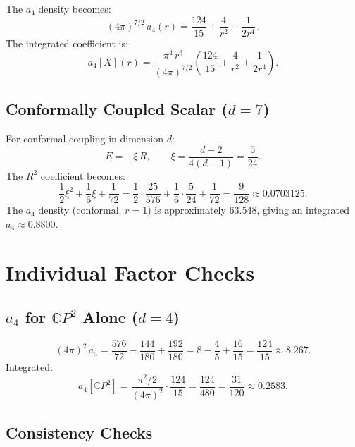 \documentclass[11pt,a4paper]{article}
\begin{document}
The $a_4$ density becomes:
\begin{equation}\label{eq:a4-r}
(4\pi)^{7/2}\,a_4(r) = \frac{124}{15}
  + \frac{4}{r^2} + \frac{1}{2r^4}\,.
\end{equation}
The integrated coefficient is:
\begin{equation}
a_4[X](r) = \frac{\pi^4\,r^3}{(4\pi)^{7/2}}
  \left(\frac{124}{15} + \frac{4}{r^2} + \frac{1}{2r^4}\right).
\end{equation}

\subsection{Conformally Coupled Scalar ($d = 7$)}

For conformal coupling in dimension $d$:
\[
E = -\xi\,R, \qquad \xi = \frac{d-2}{4(d-1)} = \frac{5}{24}.
\]
The $R^2$ coefficient becomes:
\[
\frac{1}{2}\xi^2 + \frac{1}{6}\xi + \frac{1}{72}
= \frac{1}{2}\cdot\frac{25}{576} + \frac{1}{6}\cdot\frac{5}{24} + \frac{1}{72}
= \frac{9}{128} \approx 0.0703125.
\]
The $a_4$ density (conformal, $r = 1$) is approximately $63.548$,
giving an integrated $a_4 \approx 0.8800$.


\section{Individual Factor Checks}

\subsection{$a_4$ for $\mathbb{C}P^2$ Alone ($d = 4$)}

\begin{equation}
(4\pi)^2\,a_4 = \frac{576}{72} - \frac{144}{180} + \frac{192}{180}
= 8 - \frac{4}{5} + \frac{16}{15}
= \frac{124}{15} \approx 8.267.
\end{equation}
Integrated:
\begin{equation}
a_4[\mathbb{C}P^2] = \frac{\pi^2/2}{(4\pi)^2}\cdot\frac{124}{15}
= \frac{124}{480} = \frac{31}{120} \approx 0.2583.
\end{equation}

\subsection{Consistency Checks}
\end{document}
